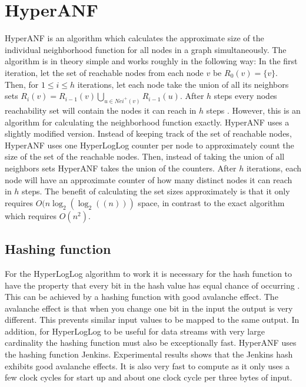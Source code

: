 \section{HyperANF}
HyperANF is an algorithm which calculates the approximate size of the individual neighborhood function for all nodes in a graph simultaneously. The algorithm is in theory simple and works roughly in the following way: In the first iteration, let the set of reachable nodes from each node $v$ be $R_0(v) = \{v\}$. Then, for $1 \leq i \leq h$ iterations, let each node take the union of all its neighbors sets $R_i(v) = R_{i-1}(v) \bigcup\limits_{u \in Nei^+(v)} R_{i-1}(u) $. After $h$ steps every nodes reachability set will contain the nodes it can reach in $h$ steps \cite{hyperball}. However, this is an algorithm for calculating the neighborhood function exactly. HyperANF uses a slightly modified version. Instead of keeping track of the set of reachable nodes, HyperANF uses one HyperLogLog counter per node to approximately count the size of the set of the reachable nodes. Then, instead of taking the union of all neighbors sets HyperANF takes the union of the counters. After $h$ iterations, each node will have an approximate counter of how many distinct nodes it can reach in $h$ steps. The benefit of calculating the set sizes approximately is that it only requires $O(n\log_2(\log_2((n)))$ space, in contrast to the exact algorithm which requires $O(n^2)$.


\subsection{Hashing function}
For the HyperLogLog algorithm to work it is necessary for the hash function to have the property that every bit in the hash value has equal chance of occurring \cite{hyperloglog}. This can be achieved by a hashing function with good avalanche effect. The avalanche effect is that when you change one bit in the input the output is very different. This prevents similar input values to be mapped to the same output. In addition, for HyperLogLog to be useful for data streams with very large cardinality the hashing function must also be exceptionally fast. HyperANF uses the hashing function Jenkins. Experimental results shows that the Jenkins hash exhibits good avalanche effects. It is also very fast to compute as it only uses a few clock cycles for start up and about one clock cycle per three bytes of input.

\iffalse
\subsection{BroadWord}
Broadword is a way to do several calculations at the same time using cleverly constructed binary-logic expressions. HyperANF uses broadword to take the union $U$ of two HyperLogLog counters $A$ and $B$, which effectively is taking $\forall i; U_i = max(A_i,B_i)$
\fi


